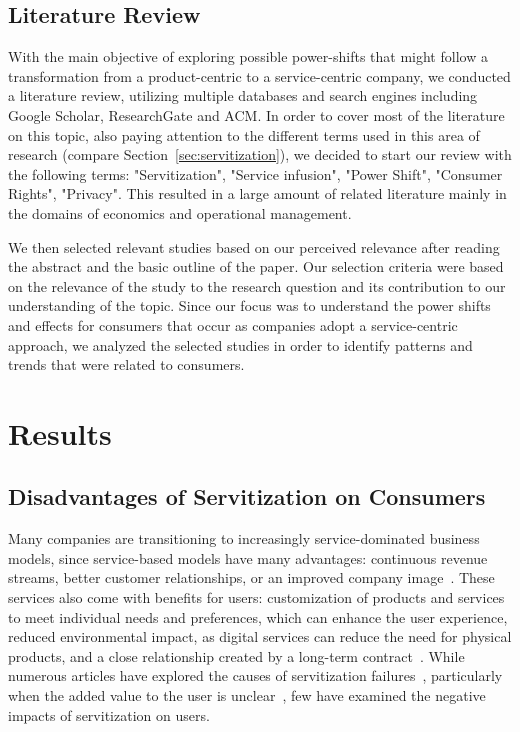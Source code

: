 \documentclass[sigplan,screen,nonacm]{acmart}
\begin{document}
\subsection{Literature Review}
With the main objective of exploring possible power-shifts that might follow a transformation from a product-centric to a service-centric company, we conducted a literature review, utilizing multiple databases and search engines including Google Scholar, ResearchGate and ACM. 
In order to cover most of the literature on this topic, also paying attention to the different terms used in this area of research (compare Section~\ref{sec:servitization}), we decided to start our review with the following terms: "Servitization", "Service infusion", "Power Shift", "Consumer Rights", "Privacy". This resulted in a large amount of related literature mainly in the domains of economics and operational management.

We then selected relevant studies based on our perceived relevance after reading the abstract and the basic outline of the paper. Our selection criteria were based on the relevance of the study to the research question and its contribution to our understanding of the topic.
Since our focus was to understand the power shifts and effects for consumers that occur as companies adopt a service-centric approach, we analyzed the selected studies in order to identify patterns and trends that were related to consumers. 


\section{Results}
\subsection{Disadvantages of Servitization on Consumers}
\label{sec:disadvantages}
Many companies are transitioning to increasingly service-dominated business models, since service-based models have many advantages: continuous revenue streams, better customer relationships, or an improved company image~\cite{brady2005creating, fang2008effect}. These services also come with benefits for users: customization of products and services to meet individual needs and preferences, which can enhance the user experience, reduced environmental impact, as digital services can reduce the need for physical products, and a close relationship created by a long-term contract~\cite{luoto2017critical, mosch2021trapped}. While numerous articles have explored the causes of servitization failures~\cite{valtakoski2017explaining, gebauer2005overcoming, kastalli2013servitization}, particularly when the added value to the user is unclear~\cite{kamalaldin2020transforming}, few have examined the negative impacts of servitization on users.
\end{document}

